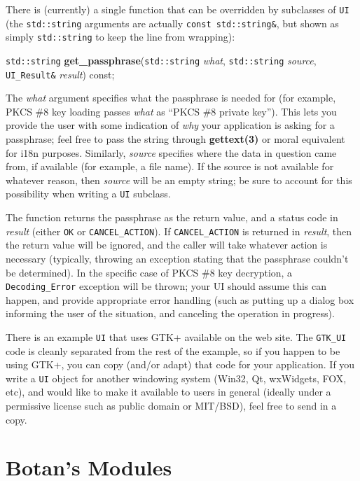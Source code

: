 \documentclass{article}
\newcommand{\function}[1]{\textbf{#1}}
\newcommand{\type}[1]{\texttt{#1}}
\renewcommand{\arg}[1]{\textsl{#1}}
\begin{document}
There is (currently) a single function that can be overridden by subclasses of
\type{UI} (the \type{std::string} arguments are actually \type{const
std::string\&}, but shown as simply \type{std::string} to keep the line from
wrapping):

\noindent
\type{std::string} \function{get\_passphrase}(\type{std::string} \arg{what},
                                              \type{std::string} \arg{source},
                                     \type{UI\_Result\&} \arg{result}) const;

The \arg{what} argument specifies what the passphrase is needed for (for
example, PKCS \#8 key loading passes \arg{what} as ``PKCS \#8 private
key''). This lets you provide the user with some indication of \emph{why} your
application is asking for a passphrase; feel free to pass the string through
\function{gettext(3)} or moral equivalent for i18n purposes. Similarly,
\arg{source} specifies where the data in question came from, if available (for
example, a file name). If the source is not available for whatever reason, then
\arg{source} will be an empty string; be sure to account for this possibility
when writing a \type{UI} subclass.

The function returns the passphrase as the return value, and a status code in
\arg{result} (either \type{OK} or \type{CANCEL\_ACTION}). If
\type{CANCEL\_ACTION} is returned in \arg{result}, then the return value will
be ignored, and the caller will take whatever action is necessary (typically,
throwing an exception stating that the passphrase couldn't be determined). In
the specific case of PKCS \#8 key decryption, a \type{Decoding\_Error}
exception will be thrown; your UI should assume this can happen, and provide
appropriate error handling (such as putting up a dialog box informing the user
of the situation, and canceling the operation in progress).

There is an example \type{UI} that uses GTK+ available on the web site. The
\type{GTK\_UI} code is cleanly separated from the rest of the example, so if
you happen to be using GTK+, you can copy (and/or adapt) that code for your
application. If you write a \type{UI} object for another windowing system
(Win32, Qt, wxWidgets, FOX, etc), and would like to make it available to users
in general (ideally under a permissive license such as public domain or
MIT/BSD), feel free to send in a copy.

\pagebreak
\section{Botan's Modules}
\end{document}
